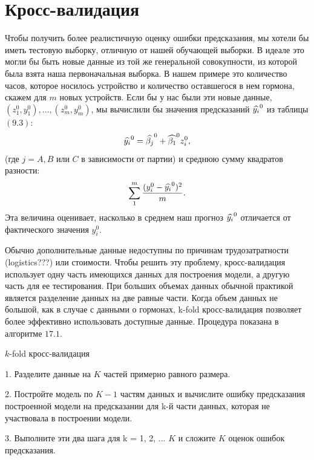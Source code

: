 \section{Кросс-валидация}
Чтобы получить более реалистичную оценку ошибки предсказания, мы хотели бы иметь тестовую выборку, отличную от нашей обучающей выборки. В идеале это могли бы быть новые данные из той же генеральной совокупности, из которой была взята наша первоначальная выборка. В нашем примере это количество часов, которое носилось устройство и количество оставшегося в нем гормона, скажем для $m$ новых устройств. Если бы у нас были эти новые данные, $(z_{1}^{0}, y_{1}^{0}),\ldots, (z_{m}^{0},y_{m}^{0})$, мы вычислили бы значения предсказаний $\widehat{y_{i}}^{0}$ из таблицы $(9.3)$:
\begin{equation}
\widehat{y_{i}}^{0} = \widehat{\beta_{j}}^{0} + \widehat{\beta_{1}}^{0}z_{i}^{0},
\end{equation}
(где $j = A, B$ или $C$ в зависимости от партии) и среднюю сумму квадратов разности:
\begin{equation}
\sum_{1}^{m} \frac{(y_{i}^{0} - \widehat{y_{i}}^{0})^{2}}{m}.
\end{equation}
Эта величина оценивает, насколько в среднем наш прогноз $\widehat{y_{i}}^{0}$ отличается от фактического значения $y_{i}^{0}$. 

Обычно дополнительные данные недоступны по причинам трудозатратности (logistics???) или стоимости. Чтобы решить эту проблему, кросс-валидация использует одну часть имеющихся данных для построения модели, а другую часть для ее тестирования. При больших объемах данных обычной практикой является разделение данных на две равные части. Когда объем данных не большой, как в случае с данными о гормонах, k-fold кросс-валидация позволяет более эффективно использовать доступные данные. Процедура показана в алгоритме $17.1.$
\begin{algorithm}
\caption{$k$-fold кросс-валидация}
1. Разделите данные на $K$ частей примерно равного размера.

2. Постройте модель по $K - 1$ частям данных и вычислите ошибку предсказания построенной модели на предсказании для k-й части данных, которая не участвовала в построении модели.

3. Выполните эти два шага для k = 1, 2, ... $K$ и сложите $K$ оценок ошибок предсказания.
\end{algorithm}

